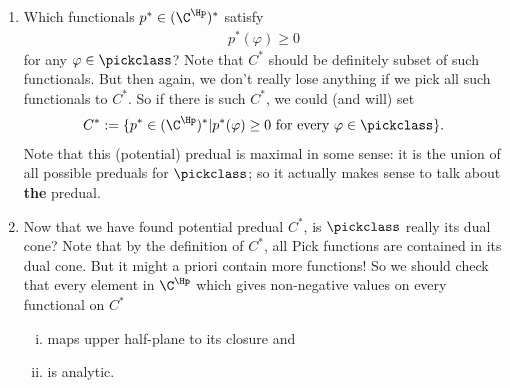 \begin{enumerate}
	\item Which functionals $p^{*} \in (\C^{\Hp})^{*}$ satisfy
	\begin{align*}
		p^{*}(\varphi) \geq 0
	\end{align*}
	for any $\varphi \in \pickclass$? Note that $C^{*}$ should be definitely subset of such functionals. But then again, we don't really lose anything if we pick all such functionals to $C^{*}$. So if there is such $C^{*}$, we could (and will) set
	\begin{align*}
		C^{*} := \{p^{*} \in (\C^{\Hp})^{*} | p^{*}(\varphi) \geq 0 \text{ for every $\varphi \in \pickclass$}\}.
	\end{align*}
	Note that this (potential) predual is maximal in some sense: it is the union of all possible preduals for $\pickclass$; so it actually makes sense to talk about \textbf{the} predual.
	\item Now that we have found potential predual $C^{*}$, is $\pickclass$ really its dual cone? Note that by the definition of $C^{*}$, all Pick functions are contained in its dual cone. But it might a priori contain more functions! So we should check that every element in $\C^{\Hp}$ which gives non-negative values on every functional on $C^{*}$
	\begin{enumerate}[(i)]
		\item maps upper half-plane to its closure and
		\item is analytic.
	\end{enumerate}
\end{enumerate}

\begin{comment}
To further highlight the step $3$, let's return to the realm of $k$-tone functions for a while. Recall that we set out to define $k$-tone functions as a set of functions that are more or less functions with non-negative $k$:th derivative. So, why not just define them as the set of functions with non-negative $k$:th derivative? The problem is that such functions are rather fragile. They are, for instance, not closed under pointwise convergence. Now, one could try to run the above steps for such functions. Let's say we are investigating $k$-tone functions on $(a, b)$. At step $1$ one would observe that one should think about $(\R^{(a, b)})^{*}$ as some kind of piecewise polynomial functions. At step $2$ one could choose non-negative such functions as $C^{*}$. Or some subset of them: we chose Peano kernels. But at step $3$ there's a problem: we get more functions.
\end{comment}

